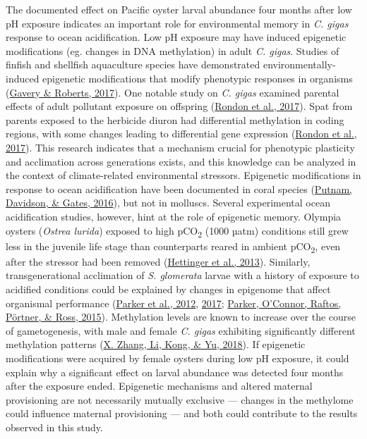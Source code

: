 \documentclass [11pt, proquest] {uwthesis}[2015/03/03]
\begin{document}
The documented effect on Pacific oyster larval abundance four months after low pH exposure indicates an important role for environmental memory in \emph{C. gigas} response to ocean acidification. Low pH exposure may have induced epigenetic modifications (eg. changes in DNA methylation) in adult \emph{C. gigas}. Studies of finfish and shellfish aquaculture species have demonstrated environmentally-induced epigenetic modifications that modify phenotypic responses in organisms (\protect\hyperlink{ref-Gavery2017}{Gavery \& Roberts, 2017}). One notable study on \emph{C. gigas} examined parental effects of adult pollutant exposure on offspring (\protect\hyperlink{ref-Rondon2017}{Rondon et al., 2017}). Spat from parents exposed to the herbicide diuron had differential methylation in coding regions, with some changes leading to differential gene expression (\protect\hyperlink{ref-Rondon2017}{Rondon et al., 2017}). This research indicates that a mechanism crucial for phenotypic plasticity and acclimation across generations exists, and this knowledge can be analyzed in the context of climate-related environmental stressors. Epigenetic modifications in response to ocean acidification have been documented in coral species (\protect\hyperlink{ref-Putnam2016}{Putnam, Davidson, \& Gates, 2016}), but not in molluscs. Several experimental ocean acidification studies, however, hint at the role of epigenetic memory. Olympia oysters (\emph{Ostrea lurida}) exposed to high pCO\textsubscript{2} (1000 µatm) conditions still grew less in the juvenile life stage than counterparts reared in ambient pCO\textsubscript{2}, even after the stressor had been removed (\protect\hyperlink{ref-Hettinger2013}{Hettinger et al., 2013}). Similarly, transgenerational acclimation of \emph{S. glomerata} larvae with a history of exposure to acidified conditions could be explained by changes in epigenome that affect organismal performance (\protect\hyperlink{ref-Parker2012}{Parker et al., 2012}, \protect\hyperlink{ref-Parker2017}{2017}; \protect\hyperlink{ref-Parker2015}{Parker, O'Connor, Raftos, Pörtner, \& Ross, 2015}). Methylation levels are known to increase over the course of gametogenesis, with male and female \emph{C. gigas} exhibiting significantly different methylation patterns (\protect\hyperlink{ref-Zhang2018}{X. Zhang, Li, Kong, \& Yu, 2018}). If epigenetic modifications were acquired by female oysters during low pH exposure, it could explain why a significant effect on larval abundance was detected four months after the exposure ended. Epigenetic mechanisms and altered maternal provisioning are not necessarily mutually exclusive --- changes in the methylome could influence maternal provisioning --- and both could contribute to the results observed in this study.
\end{document}
